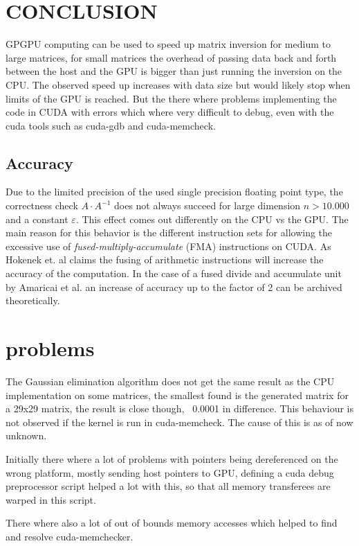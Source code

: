 
\section{CONCLUSION}
\label{sec:conclusion}

GPGPU computing can be used to speed up matrix inversion for medium to large matrices, for small matrices the overhead of passing data back and forth between the host and the GPU is bigger than just running the inversion on the CPU. The observed speed up increases with data size but would likely stop when limits of the GPU is reached. But the there where problems implementing the code in CUDA with errors which where very difficult to debug, even with the cuda tools such as cuda-gdb and cuda-memcheck.

\subsection*{Accuracy}
Due to the limited precision of the used single precision floating point type, the correctness check $A \cdot A^{-1}$ does not always succeed for large dimension $n > 10.000$ and a constant $\varepsilon$. This effect comes out differently on the CPU vs the GPU. The main reason for this behavior is the different instruction sets for allowing the excessive use of \emph{fused-multiply-accumulate} (FMA) instructions on CUDA. As Hokenek et. al \cite{Hokenek90} claims the fusing of arithmetic instructions will increase the accuracy of the computation. In the case of a fused divide and accumulate unit by Amaricai et al. \cite{Amaricai2010} an increase of accuracy up to the factor of 2 can be archived theoretically.

\section{problems}
The Gaussian elimination algorithm does not get the same result as the CPU implementation on some matrices, the smallest found is the generated matrix for a 29x29 matrix, the result is close though, ~0.0001 in difference. This behaviour is not observed if the kernel is run in cuda-memcheck. The cause of this is as of now unknown. 

Initially there where a lot of problems with pointers being dereferenced on the wrong platform, mostly sending host pointers to GPU, defining a cuda debug preprocessor script helped a lot with this, so that all memory transferees are warped in this script. 

There where also a lot of out of bounds memory accesses which helped to find and resolve cuda-memchecker.
